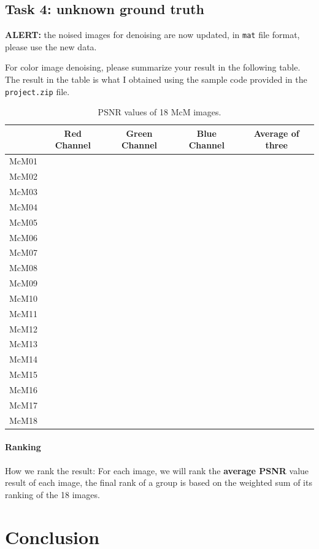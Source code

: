 \documentclass[a4paper,11pt]{article}
\begin{document}
\subsection{Task 4: unknown ground truth}


{\color{red} {\bf ALERT:} the noised images for denoising are now updated, in {\tt mat} file format, please use the new data.} 


For color image denoising, please summarize your result in the following table. The result in the table is what I obtained using the sample code provided in the {\tt project.zip} file. 

\begin{table}[h]
\centering
\caption{PSNR values of 18 McM images.}
\label{tab:result_task4}
\begin{tabular}{|c|c|c|c|c|}
\hline
 & Red Channel & Green Channel & Blue Channel & Average of three \\ \hline
McM01 &  &  &  &  \\ \hline
McM02 &  &  &  &  \\ \hline
McM03 &  &  &  &  \\ \hline
McM04 &  &  &  &  \\ \hline
McM05 &  &  &  &  \\ \hline
McM06 &  &  &  &  \\ \hline
McM07 &  &  &  &  \\ \hline
McM08 &  &  &  &  \\ \hline
McM09 &  &  &  &  \\ \hline
McM10 &  &  &  &  \\ \hline
McM11 &  &  &  &  \\ \hline
McM12 &  &  &  &  \\ \hline
McM13 &  &  &  &  \\ \hline
McM14 &  &  &  &  \\ \hline
McM15 &  &  &  &  \\ \hline
McM16 &  &  &  &  \\ \hline
McM17 &  &  &  &  \\ \hline
McM18 &  &  &  &  \\ \hline
\end{tabular}
%
\end{table}



\paragraph{Ranking} 
How we rank the result: For each image, we will rank the {\bf average PSNR} value result of each image, the final rank of a group is based on the weighted sum of its ranking of the 18 images. 




\clearpage


\section{Conclusion}




\end{document}
